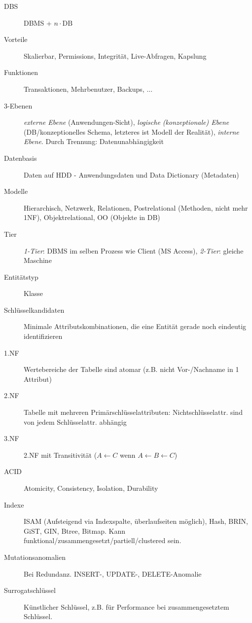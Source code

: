 \documentclass[10pt,landscape,a4paper]{article}
\begin{document}
\begin{multicols*}{3}
\begin{description}
\item[DBS]{DBMS + $n \cdot \mathrm{DB}$}
\item[Vorteile]{Skalierbar, Permissions, Integrität, Live-Abfragen, Kapslung}
\item[Funktionen]{Transaktionen, Mehrbenutzer, Backups, $\ldots$}
\item[3-Ebenen]{\emph{externe Ebene} (Anwendungen-Sicht), \emph{logische (konzeptionale) Ebene}
    (DB/konzeptionelles Schema, letzteres ist Modell der Realität), \emph{interne
    Ebene}. Durch Trennung: Datenunabhängigkeit}
\item[Datenbasis]{Daten auf HDD - Anwendungsdaten und Data Dictionary (Metadaten)}
\item[Modelle]{Hierarchisch, Netzwerk, Relationen, Postrelational (Methoden,
    nicht mehr 1NF), Objektrelational, OO (Objekte in DB)}
\item[Tier]{\emph{1-Tier}: DBMS im selben Prozess wie Client (MS Access), \emph{2-Tier}:
    gleiche Maschine}
\item[Entitätstyp]{Klasse}
\item[Schlüsselkandidaten]{Minimale Attributskombinationen, die eine Entität
    gerade noch eindeutig identifizieren}
\item[1.NF]{Wertebereiche der Tabelle sind atomar (z.B. nicht Vor-/Nachname in 1 Attribut)}
\item[2.NF]{Tabelle mit mehreren Primärschlüsselattributen: Nichtschlüsselattr. sind
    von jedem Schlüsselattr. abhängig}
\item[3.NF]{2.NF mit Transitivität ($A \leftarrow C$ wenn $A \leftarrow B \leftarrow C$)}
\item[ACID]{Atomicity, Consistency, Isolation, Durability}
\item[Indexe]{ISAM (Aufsteigend via Indexspalte, überlaufseiten möglich), Hash, BRIN, GiST, GIN, Btree, Bitmap. Kann funktional/zusammengesetzt/partiell/clustered sein.}
\item[Mutationsanomalien]{Bei Redundanz. INSERT-, UPDATE-, DELETE-Anomalie}
\item[Surrogatschlüssel]{Künstlicher Schlüssel, z.B. für Performance bei
    zusammengesetztem Schlüssel}.
\end{description}


\end{multicols*}
\end{document}
